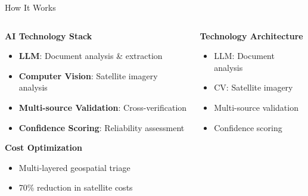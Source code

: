 \documentclass[aspectratio=169]{beamer}
\begin{document}
\begin{frame}{How It Works}
    \begin{columns}
        \begin{column}{0.5\textwidth}
            \textbf{AI Technology Stack}
            \begin{itemize}
                \item \textbf{LLM}: Document analysis \& extraction
                \item \textbf{Computer Vision}: Satellite imagery analysis
                \item \textbf{Multi-source Validation}: Cross-verification
                \item \textbf{Confidence Scoring}: Reliability assessment
            \end{itemize}
            
            \vspace{0.5cm}
            \textbf{Cost Optimization}
            \begin{itemize}
                \item Multi-layered geospatial triage
                \item 70\% reduction in satellite costs
            \end{itemize}
        \end{column}
        \begin{column}{0.5\textwidth}
            \begin{center}
                \textbf{Technology Architecture}
                \vspace{0.5cm}
                \begin{itemize}
                    \item LLM: Document analysis
                    \item CV: Satellite imagery
                    \item Multi-source validation
                    \item Confidence scoring
                \end{itemize}
            \end{center}
        \end{column}
    \end{columns}
\end{frame}
\end{document}
